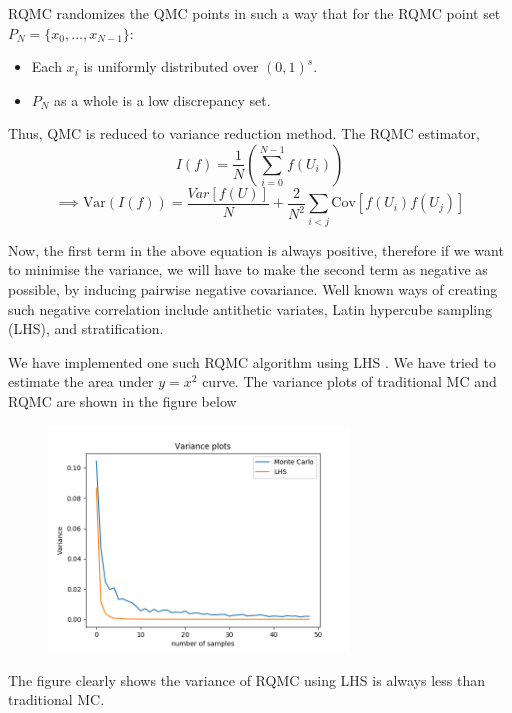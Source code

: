 \documentclass[12pt,letterpaper, twoside]{article}
\theoremstyle{definition}
\begin{document}
RQMC \cite{owenReport}\cite{qmcWikipedia}\cite{owenReport2} randomizes the QMC points in such a way that for the RQMC point set $P_N = \{x_0,\dots,x_{N-1}\}$:

\begin{itemize}
    \item Each $x_i$ is uniformly distributed over $(0,1)^s$.
    \item $P_N$ as a whole is a low discrepancy set.
\end{itemize}

Thus, QMC is reduced to variance reduction method. The RQMC estimator,
\begin{equation*}
    I(f) = \frac{1}{N}(\sum_{i = 0}^{N-1}f(U_i))
\end{equation*}
\begin{equation*}
    \implies \text{Var}(I(f)) = \frac{Var[f(U)]}{N} + \frac{2}{N^2}\sum_{i<j}\text{Cov}[f(U_i)f(U_j)]
\end{equation*}

Now, the first term in the above equation is always positive, therefore if we want to minimise the variance, we will have to make the second term as negative as possible, by inducing pairwise negative covariance. Well known ways of creating such negative correlation include antithetic variates, Latin hypercube sampling (LHS), and stratification.

\newpage

We have implemented one such RQMC algorithm using LHS \cite{LHSWiki}. We have tried to estimate the area under $y = x^2$ curve. The variance plots of traditional MC and RQMC are shown in the figure below

\begin{figure}[h]
\includegraphics[width=8cm]{images/variance_LHS_vs_MC.png}
\centering
\end{figure}
 
The figure clearly shows the variance of RQMC using LHS is always less than traditional MC.
\end{document}
